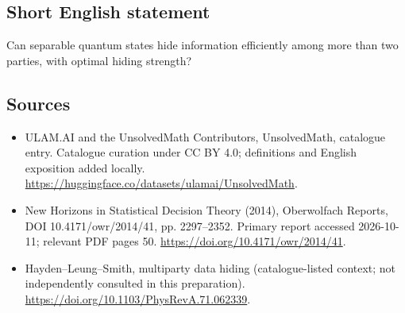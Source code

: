 \documentclass[11pt]{article}
\begin{document}
\subsection{Short English statement}
Can separable quantum states hide information efficiently among more than two parties, with optimal hiding strength?
\subsection{Sources}
\begin{itemize}
\item[\hypertarget{source:statement:1}{S1}] ULAM.AI and the UnsolvedMath Contributors, UnsolvedMath, catalogue entry. Catalogue curation under CC BY 4.0; definitions and English exposition added locally.
\url{https://huggingface.co/datasets/ulamai/UnsolvedMath}.
\item[\hypertarget{source:statement:2}{S2}] New Horizons in Statistical Decision Theory (2014), Oberwolfach Reports, DOI 10.4171/owr/2014/41, pp. 2297--2352. Primary report accessed 2026-10-11; relevant PDF pages 50.
\url{https://doi.org/10.4171/owr/2014/41}.
\item[\hypertarget{source:statement:3}{S3}] Hayden--Leung--Smith, multiparty data hiding (catalogue-listed context; not independently consulted in this preparation).
\url{https://doi.org/10.1103/PhysRevA.71.062339}.
\end{itemize}
\label{end:statement}
\end{document}
